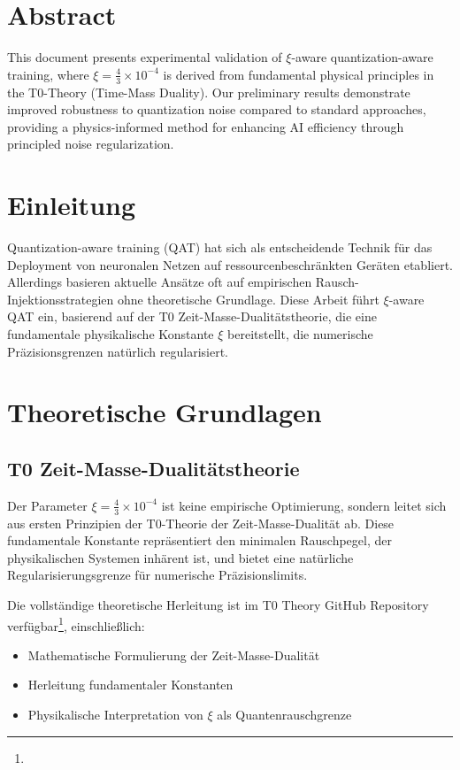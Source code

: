 \section*{Abstract}
		This document presents experimental validation of $\xi$-aware quantization-aware training, where $\xi = \frac{4}{3} \times 10^{-4}$ is derived from fundamental physical principles in the T0-Theory (Time-Mass Duality). Our preliminary results demonstrate improved robustness to quantization noise compared to standard approaches, providing a physics-informed method for enhancing AI efficiency through principled noise regularization.

	
	
	\section{Einleitung}
	
	Quantization-aware training (QAT) hat sich als entscheidende Technik für das Deployment von neuronalen Netzen auf ressourcenbeschränkten Geräten etabliert. Allerdings basieren aktuelle Ansätze oft auf empirischen Rausch-Injektionsstrategien ohne theoretische Grundlage. Diese Arbeit führt $\xi$-aware QAT ein, basierend auf der T0 Zeit-Masse-Dualitätstheorie, die eine fundamentale physikalische Konstante $\xi$ bereitstellt, die numerische Präzisionsgrenzen natürlich regularisiert.
	
	\section{Theoretische Grundlagen}
	
	\subsection{T0 Zeit-Masse-Dualitätstheorie}
	
	Der Parameter $\xi = \frac{4}{3} \times 10^{-4}$ ist keine empirische Optimierung, sondern leitet sich aus ersten Prinzipien der T0-Theorie der Zeit-Masse-Dualität ab. Diese fundamentale Konstante repräsentiert den minimalen Rauschpegel, der physikalischen Systemen inhärent ist, und bietet eine natürliche Regularisierungsgrenze für numerische Präzisionslimits.
	
	Die vollständige theoretische Herleitung ist im T0 Theory GitHub Repository verfügbar\footnote{}, einschließlich:
	\begin{itemize}
		\item Mathematische Formulierung der Zeit-Masse-Dualität
		\item Herleitung fundamentaler Konstanten
		\item Physikalische Interpretation von $\xi$ als Quantenrauschgrenze
	\end{itemize}
	
